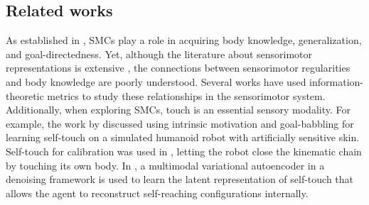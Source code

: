 \subsection{Related works}

As established in \cite{Jacquey2019Sensorimotorcontingenciesas}, SMCs play a role in acquiring body knowledge, generalization, and goal-directedness. Yet, although the literature about sensorimotor representations is extensive \cite{Nguyen2021Sensorimotorrepresentationlearning}, the connections between sensorimotor regularities and body knowledge are poorly understood. Several works \cite{Schmidt2013Bootstrappingperceptionusing,Lungarella2006Mappinginformationflow,Polani2009Modelsinformationprocessing,Bossomaier2016introductiontransferentropy,Olsson2006unknownsensorsactuators} have used information-theoretic metrics to study these relationships in the sensorimotor system. Additionally, when exploring SMCs, touch is an essential sensory modality. For example, the work by \cite{Gama2021Goaldirectedtactile} discussed using intrinsic motivation and goal-babbling for learning self-touch on a simulated humanoid robot with artificially sensitive skin. Self-touch for calibration was used in \cite{Roncone2014Automatickinematicchain}, letting the robot close the kinematic chain by touching its own body. In \cite{Marcel2022Learningreachown}, a multimodal variational autoencoder in a denoising framework is used to learn the latent representation of self-touch that allows the agent to reconstruct self-reaching configurations internally.

